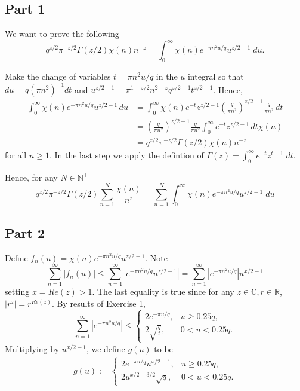 \documentclass{article}
\theoremstyle{definition}
\theoremstyle{definition}
\theoremstyle{remark}
\newcommand{\x}{\chi}
\newcommand{\bb}[1]{\mathbb{#1}} %
\begin{document}
\subsection*{Part 1}
We want to prove the following
\begin{equation*}
    q^{z/2}\pi^{-z/2}\Gamma(z/2) \chi(n)n^{-z} = \int_{0}^{\infty} \chi(n)e^{-\pi n^2 u/q} u^{z/2-1} \;du.
\end{equation*}

Make the change of variables $t = \pi n^2 u / q$ in the $u$ integral so that $du = q (\pi n^2)^{-1} dt$ and $u^{z/2 - 1} = \pi^{1-z/2}n^{2-z}q^{z/2 -1}t^{z/2 - 1}$.
Hence,
\begin{align}
    \int_0^{\infty} \x(n)e^{-\pi n^2 u / q} u^{z/2 - 1} \,du 
	&= \int_0^{\infty} \x(n)e^{-t} z^{z/2 - 1} \left( \frac{q}{\pi n^2}\right)^{z/2 -1} \frac{q}{\pi n^2}\,dt  \\
	&= \left( \frac{q}{\pi n^2}\right)^{z/2 -1} \frac{q}{\pi n^2} \int_0^{\infty} e^{-t} z^{z/2 - 1}  \,dt  \x(n) \\
	&= q^{z/2}\pi^{-z/2}\Gamma(z/2) \chi(n)n^{-z}
\end{align}
for all $n \geq 1$. 
In the last step we apply the defintion of $\Gamma(z) = \int_0^{\infty}e^{-t}z^{t-1} \;dt$.

Hence, for any $N \in \mathbb{N}^+$
\begin{equation*}
	q^{z/2}\pi^{-z/2}\Gamma(z/2)  \sum_{n=1}^{N} \frac{\x(n)}{n^z} = \sum_{n=1}^{N} \int_{0}^{\infty} \chi(n)e^{-\pi n^2 u/q} u^{z/2-1} \;du
\end{equation*}

\subsection*{Part 2}

Define $f_n(u) = \chi(n)e^{-\pi n^2 u/q} u^{z/2-1}$.
Note
\begin{dmath}
	\sum_{n=1}^{\infty} |f_n(u)| 
	\leq \sum_{n=1}^{\infty} |e^{-\pi n^2 u/q} u^{z/2-1}|  
	= \sum_{n=1}^{\infty} |e^{-\pi n^2 u/q}| u^{x/2-1}
\end{dmath}
setting $x = Re(z) > 1$. 
The last equality is true since for any $z \in \bb{C}, r \in \bb{R}$, $|r^z| = r^{Re(z)}$.
By results of Exercise 1, 
\begin{dmath}
	\sum_{n=1}^{\infty} |e^{-\pi n^2 u/q}| \leq
    \begin{cases}
        2e^{-\pi u / q} , & u \geq 0.25 q, \\
		2\sqrt{\frac{q}{t}}, & 0 < u < 0.25 q.
    \end{cases}
\end{dmath}
Multiplying by $u^{x/2 - 1}$, we define $g(u)$ to be
\begin{align}
	g(u) :=
    \begin{cases}
		2e^{-\pi u / q} u^{x/2 - 1} , & u \geq 0.25 q, \\
		2 u^{x/2 - 3/2}\sqrt{q}, & 0 < u < 0.25 q.
    \end{cases}
\end{align}
\end{document}
